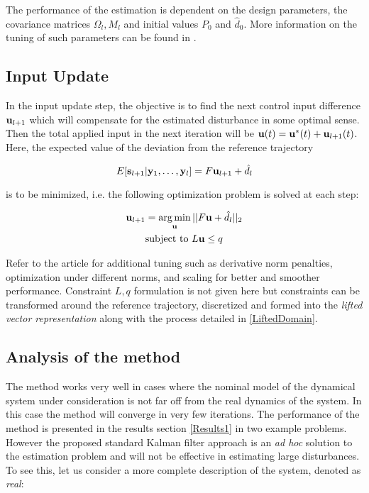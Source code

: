 The performance of the estimation is dependent on the design parameters, the covariance matrices $\Omega_{l}, M_{l}$ and initial values $P_{0}$ and $\hat{d}_{0}$. More information on the tuning of such parameters can be found in \cite{ILC_Angela}. 

\subsection{Input Update}

In the input update step, the objective is to find the next control input difference $\mathbf{u}_{l+1}$ which will compensate for the estimated disturbance in some optimal sense. Then the total applied input in the next iteration will be $\mathbf{u}(t) = \mathbf{u}^{*}(t) + \mathbf{u}_{l+1}(t)$. Here, the expected value of the deviation from the reference trajectory 

\begin{equation}
E[\mathbf{s}_{l+1}|\mathbf{y}_{1}, \ldots, \mathbf{y}_{l}] = F\mathbf{u}_{l+1} + \hat{d}_{l}
\end{equation}

is to be minimized, i.e. the following optimization problem is solved at each step:

\begin{equation}
\begin{aligned}
\mathbf{u}_{l+1} &= \operatorname*{arg\, min}_{\mathbf{u}} ||F\mathbf{u} + \hat{d}_{l}||_{2} \\ 
& \text{subject to } L\mathbf{u} \leq q
\end{aligned}
\end{equation}

Refer to the article \cite{ILC_Angela} for additional tuning such as derivative norm penalties, optimization under different norms, and scaling for better and smoother performance. Constraint $L, q$ formulation is not given here but constraints can be transformed around the reference trajectory, discretized and formed into the \emph{lifted vector representation} along with the process detailed in \ref{LiftedDomain}.

\subsection{Analysis of the method}\label{critique}

The method works very well in cases where the nominal model of the dynamical system under consideration is not far off from the real dynamics of the system. In this case the method will converge in very few iterations. The performance of the method is presented in the results section \ref{Results1} in two example problems. However the proposed standard Kalman filter approach is an \emph{ad hoc} solution to the estimation problem and will not be effective in estimating large disturbances. To see this, let us consider a more complete description of the system, denoted as \emph{real}:

